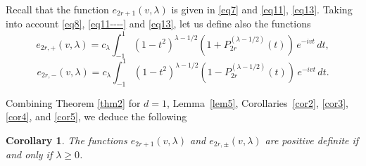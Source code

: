 \documentclass[12pt,twoside,reqno]{amsart}\usepackage[cp1251]{inputenc}
\theoremstyle{plain}
\newtheorem{corollary}[theorem]{Corollary}
\theoremstyle{remark}
\newcommand\sign{\operatorname{sign}}
\begin{document}
Recall that the function $e_{2r+1}(v,\lambda)$ is given in \eqref{eq7} and \eqref{eq11}, \eqref{eq13}.  Taking into account \eqref{eq8}, \eqref{eq11----} and \eqref{eq13},
let us define also the functions
\[
e_{2r,+}(v,\lambda)=c_{\lambda}\int_{-1}^{1}(1-t^2)^{\lambda-1/2}(1+P_{2r}^{(\lambda-1/2)}(t))\,e^{-ivt}\,dt,
\]
\[
e_{2r,-}(v,\lambda)=c_{\lambda}\int_{-1}^{1}(1-t^2)^{\lambda-1/2}(1-P_{2r}^{(\lambda-1/2)}(t))\,e^{-ivt}\,dt.
\]

Combining Theorem \ref{thm2} for $d=1$, Lemma~\ref{lem5}, Corollaries~\ref{cor2},
\ref{cor3}, \ref{cor4}, and \ref{cor5}, we deduce  the following

\begin{corollary}%
The functions  $e_{2r+1}(v,\lambda)$ and $e_{2r,\pm}(v,\lambda)$ %
are positive definite  if and only if $\lambda\ge 0$.
\end{corollary}
\end{document}
